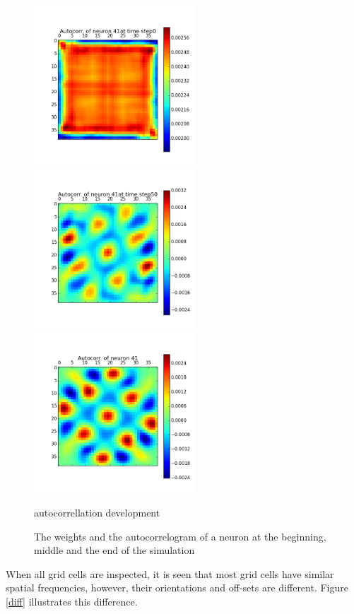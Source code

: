 \documentclass[a4paper, 12pt]{article}
\begin{document}
\begin{figure}[htbp]
\begin{minipage}[hbt]{0,49\textwidth}
        \centering
\includegraphics[width=6cm,height=6cm]{neurons/neuron_a_41_t_0.png}\\[10pt]
\includegraphics[width=6cm,height=6cm]{neurons/neuron_a_41_t_50.png}\\[10pt]
\includegraphics[width=6cm,height=6cm]{neurons/neuron_a_41.png}
        \caption{autocorrellation development}
        \label{LabelB}
\end{minipage}
\centering
\caption{The weights and the autocorrelogram of a neuron at the beginning, middle and the end of the simulation}
\label{time-evol}
\end{figure}

When all grid cells are inspected, it is seen that most grid cells have similar spatial frequencies, however, their orientations and off-sets are different. Figure \ref{diff} illustrates this difference. 
\end{document}
